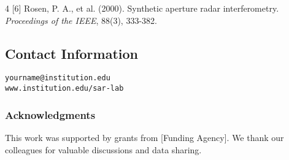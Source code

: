 \documentclass[a0paper,landscape,20pt]{extarticle}
\begin{document}
\begin{multicols}{4}
[6] Rosen, P. A., et al. (2000). Synthetic aperture radar interferometry. \textit{Proceedings of the IEEE}, 88(3), 333-382.

\vspace{0.6cm}
\subsection{Contact Information}
\texttt{yourname@institution.edu}\\
\texttt{www.institution.edu/sar-lab}

\vspace{0.4cm}
\subsubsection{Acknowledgments}
\small
This work was supported by grants from [Funding Agency]. We thank our colleagues for valuable discussions and data sharing.

\end{multicols}
\end{document}
